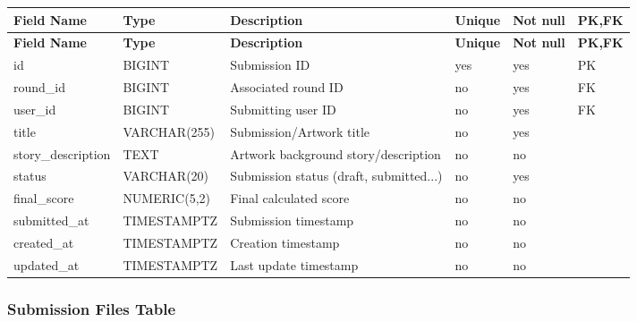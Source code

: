 \vspace{0.5em}
\renewcommand{\arraystretch}{1.15}
\setlength{\tabcolsep}{4pt}
\small
\begin{longtable}{|>{\raggedright\arraybackslash}p{}|>{\raggedright\arraybackslash}p{}|>{\raggedright\arraybackslash}p{}|>{\centering\arraybackslash}p{}|>{\centering\arraybackslash}p{}|>{\centering\arraybackslash}p{}|}
\hline
\textbf{Field Name} & \textbf{Type} & \textbf{Description} & \textbf{Unique} & \textbf{Not null} & \textbf{PK,FK} \\
\hline
\endfirsthead
\textbf{Field Name} & \textbf{Type} & \textbf{Description} & \textbf{Unique} & \textbf{Not null} & \textbf{PK,FK} \\
\hline
\endhead
id & BIGINT & Submission ID & yes & yes & PK \\
\hline
round\_id & BIGINT & Associated round ID & no & yes & FK \\
\hline
user\_id & BIGINT & Submitting user ID & no & yes & FK \\
\hline
title & VARCHAR(255) & Submission/Artwork title & no & yes & \\
\hline
story\_description & TEXT & Artwork background story/description & no & no & \\
\hline
status & VARCHAR(20) & Submission status (draft, submitted...) & no & yes & \\
\hline
final\_score & NUMERIC(5,2) & Final calculated score & no & no & \\
\hline
submitted\_at & TIMESTAMPTZ & Submission timestamp & no & no & \\
\hline
created\_at & TIMESTAMPTZ & Creation timestamp & no & no & \\
\hline
updated\_at & TIMESTAMPTZ & Last update timestamp & no & no & \\
\hline
\end{longtable}

\vspace{1em}
\subsubsection{Submission Files Table}
\label{subsubsec:submission-files-table}

